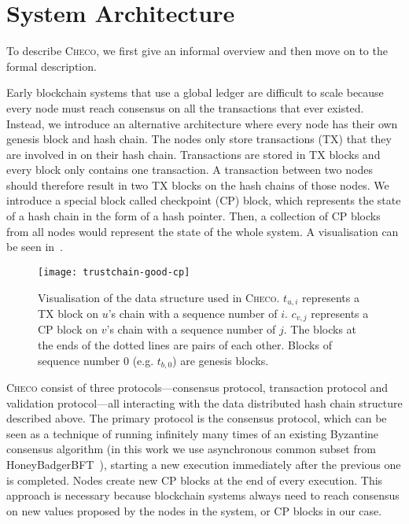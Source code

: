 \section{System Architecture}
\label{sec:system}

To describe \textsc{Checo}, we first give an informal overview and then move on to the formal description.

Early blockchain systems that use a global ledger are difficult to scale because every node must reach consensus on all the transactions that ever existed.
Instead, we introduce an alternative architecture where every node has their own genesis block and hash chain.
The nodes only store transactions (TX) that they are involved in on their hash chain.
Transactions are stored in TX blocks and every block only contains one transaction.
A transaction between two nodes should therefore result in two TX blocks on the hash chains of those nodes.
We introduce a special block called checkpoint (CP) block,
which represents the state of a hash chain in the form of a hash pointer.
Then, a collection of CP blocks from all nodes would represent the state of the whole system.
A visualisation can be seen in~.
\begin{figure}[h]
\centering
\texttt{[image: trustchain-good-cp]}
\caption{Visualisation of the data structure used in \textsc{Checo}.
$t_{u, i}$ represents a TX block on $u$'s chain with a sequence number of $i$.
$c_{v, j}$ represents a CP block on $v$'s chain with a sequence number of $j$.
The blocks at the ends of the dotted lines are pairs of each other.
Blocks of sequence number 0 (e.g. $t_{b, 0}$) are genesis blocks.}
\label{fig:trustchain-good-cp}
\end{figure}

\textsc{Checo} consist of three protocols---consensus protocol, transaction protocol and validation protocol---all interacting with the data distributed hash chain structure described above.
The primary protocol is the consensus protocol,
which can be seen as a technique of running infinitely many times of an existing Byzantine consensus algorithm (in this work we use asynchronous common subset from HoneyBadgerBFT~\cite{miller2016honey}),
starting a new execution immediately after the previous one is completed.
Nodes create new CP blocks at the end of every execution.
This approach is necessary because blockchain systems always need to reach consensus on new values proposed by the nodes in the system,
or CP blocks in our case.

